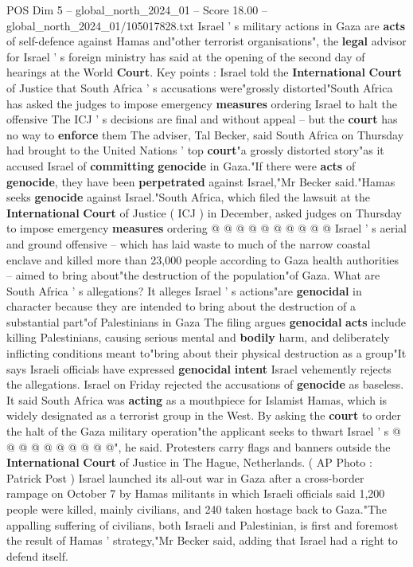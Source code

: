 \begin{textsample}{POS Dim 5 – global\_north\_2024\_01 – Score 18.00 – global\_north\_2024\_01/105017828.txt}  \label{ex:f5_pos_140}
Israel ' s military actions in Gaza are \textbf{acts} of self-defence against Hamas and"other terrorist organisations", the \textbf{legal} advisor for Israel ' s foreign ministry has said at the opening of the second day of hearings at the World \textbf{Court}.
Key points : Israel told the \textbf{International} \textbf{Court} of Justice that South Africa ' s accusations were"grossly distorted"South Africa has asked the judges to impose emergency \textbf{measures} ordering Israel to halt the offensive The ICJ ' s decisions are final and without appeal -- but the \textbf{court} has no way to \textbf{enforce} them The adviser, Tal Becker, said South Africa on Thursday had brought to the United Nations ' top \textbf{court}"a grossly distorted story"as it accused Israel of \textbf{committing} \textbf{genocide} in Gaza."If there were \textbf{acts} of \textbf{genocide}, they have been \textbf{perpetrated} against Israel,"Mr Becker said."Hamas seeks \textbf{genocide} against Israel."South Africa, which filed the lawsuit at the \textbf{International} \textbf{Court} of Justice ( ICJ ) in December, asked judges on Thursday to impose emergency \textbf{measures} ordering @ @ @ @ @ @ @ @ @ @ Israel ' s aerial and ground offensive -- which has laid waste to much of the narrow coastal enclave and killed more than 23,000 people according to Gaza health authorities -- aimed to bring about"the destruction of the population"of Gaza.
What are South Africa ' s allegations?
It alleges Israel ' s actions"are \textbf{genocidal} in character because they are intended to bring about the destruction of a substantial part"of Palestinians in Gaza The filing argues \textbf{genocidal} \textbf{acts} include killing Palestinians, causing serious mental and \textbf{bodily} harm, and deliberately inflicting conditions meant to"bring about their physical destruction as a group"It says Israeli officials have expressed \textbf{genocidal} \textbf{intent} Israel vehemently rejects the allegations.
Israel on Friday rejected the accusations of \textbf{genocide} as baseless.
It said South Africa was \textbf{acting} as a mouthpiece for Islamist Hamas, which is widely designated as a terrorist group in the West.
By asking the \textbf{court} to order the halt of the Gaza military operation"the applicant seeks to thwart Israel ' s @ @ @ @ @ @ @ @ @ @", he said.
Protesters carry flags and banners outside the \textbf{International} \textbf{Court} of Justice in The Hague, Netherlands. ( AP Photo : Patrick Post ) Israel launched its all-out war in Gaza after a cross-border rampage on October 7 by Hamas militants in which Israeli officials said 1,200 people were killed, mainly civilians, and 240 taken hostage back to Gaza."The appalling suffering of civilians, both Israeli and Palestinian, is first and foremost the result of Hamas ' strategy,"Mr Becker said, adding that Israel had a right to defend itself.

\end{textsample}
